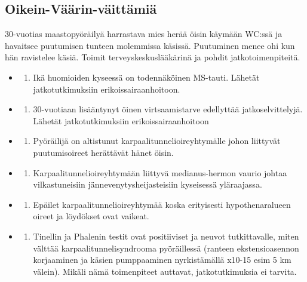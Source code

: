 \documentclass[
]{book}
\providecommand{\tightlist}{%
  \setlength{\itemsep}{0pt}\setlength{\parskip}{0pt}}
\begin{document}
\subsection{Oikein-Väärin-väittämiä}\label{oikein-vuxe4uxe4rin-vuxe4ittuxe4miuxe4}

30-vuotias maastopyöräilyä harrastava mies herää öisin käymään WC:ssä ja havaitsee puutumisen tunteen molemmissa käsissä. Puutuminen menee ohi kun hän ravistelee käsiä. Toimit terveyskeskuslääkärinä ja pohdit jatkotoimenpiteitä.

\begin{itemize}
\tightlist
\item
  \begin{enumerate}
  \def\labelenumi{\alph{enumi}.}
  \tightlist
  \item
    Ikä huomioiden kyseessä on todennäköinen MS-tauti. Lähetät jatkotutkimuksiin erikoissairaanhoitoon.
  \end{enumerate}
\item
  \begin{enumerate}
  \def\labelenumi{\alph{enumi}.}
  \setcounter{enumi}{1}
  \tightlist
  \item
    30-vuotiaan lisääntynyt öinen virtsaamistarve edellyttää jatkoselvittelyjä. Lähetät jatkotutkimuksiin erikoissairaanhoitoon
  \end{enumerate}
\item
  \begin{enumerate}
  \def\labelenumi{\alph{enumi}.}
  \setcounter{enumi}{2}
  \tightlist
  \item
    Pyöräilijä on altistunut karpaalitunnelioireyhtymälle johon liittyvät puutumisoireet herättävät hänet öisin.
  \end{enumerate}
\item
  \begin{enumerate}
  \def\labelenumi{\alph{enumi}.}
  \setcounter{enumi}{3}
  \tightlist
  \item
    Karpaalitunnelioireyhtymään liittyvä medianus-hermon vaurio johtaa vilkastuneisiin jännevenytysheijasteisiin kyseisessä yläraajassa.
  \end{enumerate}
\item
  \begin{enumerate}
  \def\labelenumi{\alph{enumi}.}
  \setcounter{enumi}{4}
  \tightlist
  \item
    Epäilet karpaalitunnelioireyhtymää koska erityisesti hypothenaralueen oireet ja löydökset ovat vaikeat.
  \end{enumerate}
\item
  \begin{enumerate}
  \def\labelenumi{\alph{enumi}.}
  \setcounter{enumi}{5}
  \tightlist
  \item
    Tinellin ja Phalenin testit ovat positiiviset ja neuvot tutkittavalle, miten välttää karpaalitunnelisyndrooma pyöräillessä (ranteen ekstensioasennon korjaaminen ja käsien pumppaaminen nyrkistämällä x10-15 esim 5 km välein). Mikäli nämä toimenpiteet auttavat, jatkotutkimuksia ei tarvita.
  \end{enumerate}
\end{itemize}
\end{document}
